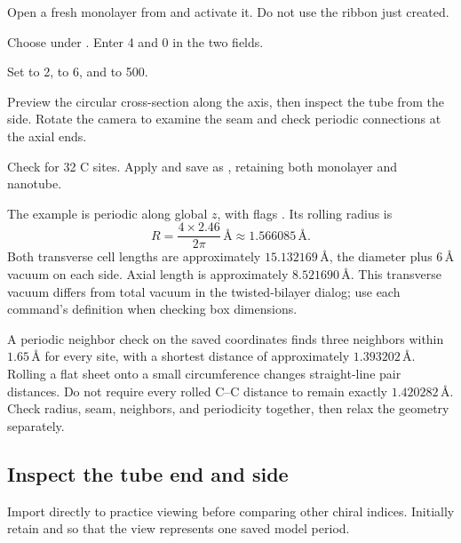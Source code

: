 \begin{steps}
  \item Open a fresh monolayer from  and activate it. Do not use the ribbon just created.
  \item Choose  under . Enter 4 and 0 in the two  fields.
  \item Set  to 2,  to 6, and  to 500.
  \item Preview the circular cross-section along the axis, then inspect the tube from the side. Rotate the camera to examine the seam and check periodic connections at the axial ends.
  \item Check for 32 C sites. Apply and save as , retaining both monolayer and nanotube.
\end{steps}

The example is periodic along global $z$, with flags . Its rolling radius is
\[
 R=\frac{4\times2.46}{2\pi}\,\text{\AA}\approx1.566085\,\text{\AA}.
\]
Both transverse cell lengths are approximately $15.132169\,\text{\AA}$, the diameter plus $6\,\text{\AA}$ vacuum on each side. Axial length is approximately $8.521690\,\text{\AA}$. This transverse vacuum differs from total vacuum in the twisted-bilayer dialog; use each command's definition when checking box dimensions.

A periodic neighbor check on the saved coordinates finds three neighbors within $1.65\,\text{\AA}$ for every site, with a shortest distance of approximately $1.393202\,\text{\AA}$. Rolling a flat sheet onto a small circumference changes straight-line pair distances. Do not require every rolled C--C distance to remain exactly $1.420282\,\text{\AA}$. Check radius, seam, neighbors, and periodicity together, then relax the geometry separately.

\subsection{Inspect the tube end and side}

Import  directly to practice viewing before comparing other chiral indices. Initially retain  and  so that the view represents one saved model period.

